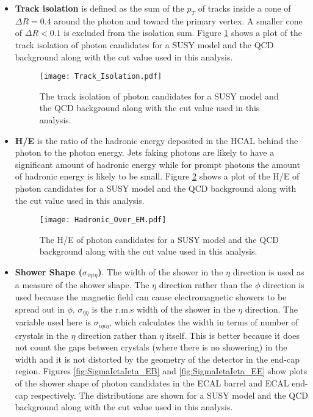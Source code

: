 \begin{itemize}
\item {\bf Track isolation} is defined as the sum of the $p_{T}$ of tracks 
inside a cone of $\Delta R = 0.4$ around the photon and toward the primary 
vertex. A smaller cone of $\Delta R < 0.1$ is excluded from the isolation 
sum. Figure \ref{fig:Track_Isolation} shows a plot of the track isolation of
photon candidates for a SUSY model and the QCD background along with the cut 
value used in this analysis.

\begin{figure}
\begin{center}
\texttt{[image: Track\_Isolation.pdf]}
\end{center}
\caption{The track isolation of photon candidates for a SUSY model and the QCD 
background along with the cut value used in this analysis.}
\label{fig:Track_Isolation}
\end{figure}

\item {\bf H/E} is the ratio of the hadronic energy deposited in the HCAL behind
the photon to the photon energy. Jets faking photons are likely to have a 
significant amount of hadronic energy while for prompt photons the amount of 
hadronic energy is likely to be small. Figure \ref{fig:Hadronic_Over_EM} shows a
plot of the H/E of photon candidates for a SUSY model and the QCD background 
along with the cut value used in this analysis.

\begin{figure}
\begin{center}
\texttt{[image: Hadronic\_Over\_EM.pdf]}
\end{center}
\caption{The H/E of photon candidates for a SUSY model and the QCD background 
along with the cut value used in this analysis.}
\label{fig:Hadronic_Over_EM}
\end{figure}

\item {\bf Shower Shape ($\sigma_{i\eta i\eta}$)}. The width of the shower in 
the $\eta$ direction is used as a measure of the shower shape. The $\eta$ 
direction rather than the $\phi$ direction is used because the magnetic field 
can cause electromagnetic showers to be spread out in $\phi$. 
$\sigma_{\eta\eta}$ is the r.m.s width of the shower in the $\eta$ direction. 
The variable used here is $\sigma_{i\eta i\eta}$, which calculates the width in 
terms of number of crystals in the $\eta$ direction rather than $\eta$ itself. 
This is better because it does not count the gaps between crystals (where there 
is no showering) in the width and it is not distorted by the geometry of the 
detector in the end-cap region. Figures \ref{fig:SigmaIetaIeta_EB} and
\ref{fig:SigmaIetaIeta_EE} show plots of the shower shape of photon candidates 
in the ECAL barrel and ECAL end-cap respectively. The distributions are shown 
for a SUSY model and the QCD background along with the cut value used in this 
analysis.


\end{itemize}
